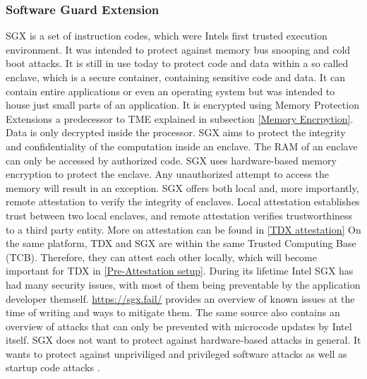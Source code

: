 \subsubsection{Software Guard Extension}
SGX is a set of instruction codes, which were Intels first trusted execution environment. It was intended to protect against memory bus snooping and cold boot attacks. It is still in use today to protect code and data within a so called enclave, which is a secure container, containing sensitive code and data. It can contain entire applications or even an operating system but was intended to house just small parts of an application. It is encrypted using Memory Protection Extensions a predecessor to TME explained in subsection \ref{Memory Encrpytion}. Data is only decrypted inside the processor\cite{intel_corporation_overview--intel-sgx-enclave_nodate}. SGX aims to protect the integrity and confidentiality of the computation inside an enclave. The RAM of an enclave can only be accessed by authorized code. SGX uses hardware-based memory encryption to protect the enclave. Any unauthorized attempt to access the memory will result in an exception. SGX offers both local and, more importantly, remote attestation to verify the integrity of enclaves. Local attestation establishes trust between two local enclaves, and remote attestation verifies trustworthiness to a third party entity. More on attestation can be found in \ref{TDX attestation} On the same platform, TDX and SGX are within the same Trusted Computing Base (TCB).  Therefore, they can attest each other locally\cite{intel_corporation_intel_2024-1}, which will become important for TDX in \ref{Pre-Attestation setup}. During its lifetime Intel SGX has had many security issues, with most of them being preventable by the application developer themself. \url{https://sgx.fail/}\cite{sgxfail} provides an overview of known issues at the time of writing and ways to mitigate them. The same source also contains an overview of attacks that can only be prevented with microcode updates by Intel itself. SGX does not want to protect against hardware-based attacks in general\cite{costan_intel_2016}. It wants to protect against unpriviliged and privileged software attacks as well as startup code attacks \cite{schutz_general_nodate}.
